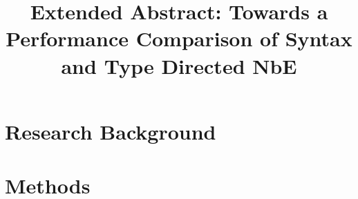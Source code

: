 \documentclass[sigplan]{acmart}
\title{Extended Abstract: Towards a Performance Comparison of Syntax and Type Directed NbE}
\begin{document}
\maketitle

\section{Research Background}

\section{Methods}

\lipsum
\end{document}
